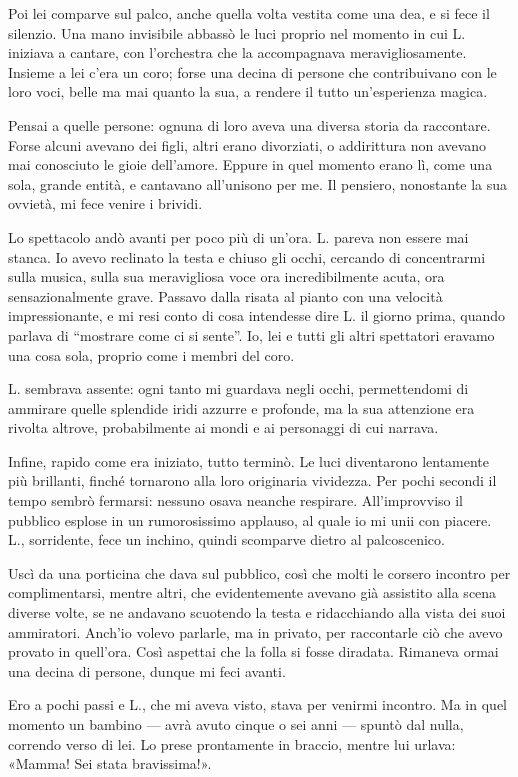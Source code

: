 \documentclass[a4paper,12pt]{book}
\begin{document}
Poi lei comparve sul palco, anche quella volta vestita come una dea, e si fece
il silenzio. Una mano invisibile abbassò le luci proprio nel momento in cui L.
iniziava a cantare, con l'orchestra che la accompagnava meravigliosamente.
Insieme a lei c'era un coro; forse una decina di persone che contribuivano con
le loro voci, belle ma mai quanto la sua, a rendere il tutto un'esperienza
magica.

Pensai a quelle persone: ognuna di loro aveva una diversa storia da raccontare.
Forse alcuni avevano dei figli, altri erano divorziati, o addirittura non
avevano mai conosciuto le gioie dell'amore. Eppure in quel momento erano lì,
come una sola, grande entità, e cantavano all'unisono per me. Il pensiero,
nonostante la sua ovvietà, mi fece venire i brividi.

Lo spettacolo andò avanti per poco più di un'ora. L. pareva non essere mai
stanca. Io avevo reclinato la testa e chiuso gli occhi, cercando di concentrarmi
sulla musica, sulla sua meravigliosa voce ora incredibilmente acuta, ora
sensazionalmente grave. Passavo dalla risata al pianto con una velocità
impressionante, e mi resi conto di cosa intendesse dire L. il giorno prima,
quando parlava di ``mostrare come ci si sente''. Io, lei e tutti gli altri
spettatori eravamo una cosa sola, proprio come i membri del coro.

L. sembrava assente: ogni tanto mi guardava negli occhi, permettendomi di
ammirare quelle splendide iridi azzurre e profonde, ma la sua attenzione era
rivolta altrove, probabilmente ai mondi e ai personaggi di cui narrava.

Infine, rapido come era iniziato, tutto terminò. Le luci diventarono lentamente
più brillanti, finché tornarono alla loro originaria vividezza. Per pochi
secondi il tempo sembrò fermarsi: nessuno osava neanche respirare.
All'improvviso il pubblico esplose in un rumorosissimo applauso, al quale io mi
unii con piacere. L., sorridente, fece un inchino, quindi scomparve dietro al
palcoscenico.

Uscì da una porticina che dava sul pubblico, così che molti le corsero incontro
per complimentarsi, mentre altri, che evidentemente avevano già assistito alla
scena diverse volte, se ne andavano scuotendo la testa e ridacchiando alla vista
dei suoi ammiratori. Anch'io volevo parlarle, ma in privato, per raccontarle ciò
che avevo provato in quell'ora. Così aspettai che la folla si fosse diradata.
Rimaneva ormai una decina di persone, dunque mi feci avanti.

Ero a pochi passi e L., che mi aveva visto, stava per venirmi incontro. Ma in
quel momento un bambino --- avrà avuto cinque o sei anni --- spuntò dal nulla,
correndo verso di lei. Lo prese prontamente in braccio, mentre lui urlava:
«Mamma! Sei stata bravissima!».
\end{document}
